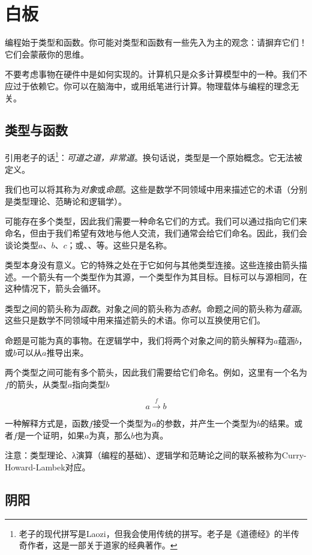\documentclass[DaoFP]{subfiles}
\begin{document}
\chapter{白板}

编程始于类型和函数。你可能对类型和函数有一些先入为主的观念：请摒弃它们！它们会蒙蔽你的思维。

不要考虑事物在硬件中是如何实现的。计算机只是众多计算模型中的一种。我们不应过于依赖它。你可以在脑海中，或用纸笔进行计算。物理载体与编程的理念无关。

\section{类型与函数}

引用老子的话\footnote{老子的现代拼写是Laozi，但我会使用传统的拼写。老子是《道德经》的半传奇作者，这是一部关于道家的经典著作。}：\emph{可道之道，非常道}。换句话说，类型是一个原始概念。它无法被定义。

我们也可以将其称为\emph{对象}或\emph{命题}。这些是数学不同领域中用来描述它的术语（分别是类型理论、范畴论和逻辑学）。

可能存在多个类型，因此我们需要一种命名它们的方式。我们可以通过指向它们来命名，但由于我们希望有效地与他人交流，我们通常会给它们命名。因此，我们会谈论类型$a$、$b$、$c$；或、、等。这些只是名称。

类型本身没有意义。它的特殊之处在于它如何与其他类型连接。这些连接由箭头描述。一个箭头有一个类型作为其源，一个类型作为其目标。目标可以与源相同，在这种情况下，箭头会循环。

类型之间的箭头称为\emph{函数}。对象之间的箭头称为\emph{态射}。命题之间的箭头称为\emph{蕴涵}。这些只是数学不同领域中用来描述箭头的术语。你可以互换使用它们。

命题是可能为真的事物。在逻辑学中，我们将两个对象之间的箭头解释为$a$蕴涵$b$，或$b$可以从$a$推导出来。
\pagebreak

两个类型之间可能有多个箭头，因此我们需要给它们命名。例如，这里有一个名为$f$的箭头，从类型$a$指向类型$b$

\[ a \xrightarrow f b \]

一种解释方式是，函数$ f$接受一个类型为$a$的参数，并产生一个类型为$b$的结果。或者$ f$是一个证明，如果$a$为真，那么$b$也为真。

注意：类型理论、λ演算（编程的基础）、逻辑学和范畴论之间的联系被称为Curry-Howard-Lambek对应。

\section{阴阳}
\end{document}
